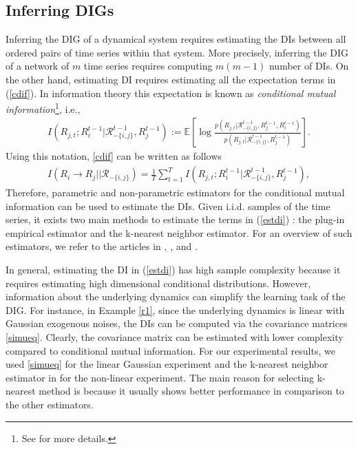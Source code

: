 \subsection{Inferring  DIGs}
Inferring the DIG of a dynamical system requires estimating the DIs between all ordered pairs of time series within that system. More precisely, inferring the DIG of a network of $m$ time series requires computing $m(m-1)$ number of DIs. 
On the other hand, estimating DI  requires estimating all the expectation terms in (\ref{cdif}).
In information theory this expectation is known as \textit{conditional mutual information}\footnote{See \citet{cover2012elements} for more details.}, i.e., 
\begin{align}
    I(R_{j,t};R_{i}^{t-1}|\mathcal{R}^{t-1}_{-\{i,j\}},R^{t-1}_{j}):=\mathbb{E}\left[\log\frac{p(R_{j,t}|\mathcal{R}^{t-1}_{-\{i,j\}},R_{j}^{t-1},R_{i}^{t-1})}{p(R_{j,t}|\mathcal{R}^{t-1}_{-\{i,j\}},R_{j}^{t-1})}\right].
\end{align}
Using this notation, \eqref{cdif} can be written as follows 
\begin{align}\label{estdi}
I(R_i\rightarrow R_j||\mathcal{R}_{-\{i,j\}})=\frac{1}{T}\sum_{t=1}^T I(R_{j,t};R_{i}^{t-1}|\mathcal{R}^{t-1}_{-\{i,j\}},R^{t-1}_{j}),
\end{align}
Therefore, parametric and non-parametric estimators for the conditional mutual information can be used to estimate the DIs. 
Given i.i.d. samples of the time series, it exists two main methods to estimate the terms in (\ref{estdi}) :  the plug-in empirical estimator and the k-nearest neighbor estimator. For an overview of such estimators, we refer to the articles in \citet{paninski2003estimation}, \citet{noshad2019scalable}, \citet{sricharan2011k} and \citet{jiao2013universal}. 
 
 
 In general, estimating the DI in (\ref{estdi}) has high sample complexity because it requires estimating high dimensional conditional distributions. 
However, information about the underlying dynamics can simplify the learning task of the DIG. 
For instance, in Example \ref{r1}, since the underlying dynamics is linear with Gaussian exogenous noises, the DIs can be computed via the covariance matrices \eqref{simueq}. 
Clearly, the covariance matrix can be estimated with lower complexity compared to conditional mutual information. 
For our experimental results, we used \eqref{simueq} for the linear Gaussian experiment and the k-nearest neighbor estimator in for the non-linear experiment. 
The main reason for selecting k-nearest method is because it usually shows better performance in comparison to the other estimators. 

